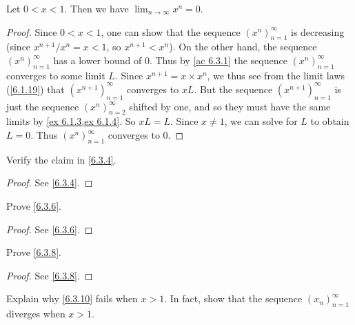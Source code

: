 \begin{proposition}\label{6.3.10}
  Let \(0 < x < 1\).
  Then we have \(\lim_{n \to \infty} x^n = 0\).
\end{proposition}

\begin{proof}
  Since \(0 < x < 1\), one can show that the sequence \((x^n)_{n = 1}^\infty\) is decreasing
  (since \(x^{n + 1} / x^n = x < 1\), so \(x^{n + 1} < x^n\)).
  On the other hand, the sequence \((x^n)_{n = 1}^\infty\) has a lower bound of \(0\).
  Thus by \cref{ac 6.3.1} the sequence \((x^n)_{n = 1}^\infty\) converges to some limit \(L\).
  Since \(x^{n + 1} = x \times x^n\), we thus see from the limit laws (\cref{6.1.19}) that \((x^{n + 1})_{n = 1}^\infty\) converges to \(xL\).
  But the sequence \((x^{n + 1})_{n = 1}^\infty\) is just the sequence \((x^n)_{n = 2}^\infty\) shifted by one, and so they must have the same limits by \cref{ex 6.1.3,ex 6.1.4}.
  So \(xL = L\).
  Since \(x \neq 1\), we can solve for \(L\) to obtain \(L = 0\).
  Thus \((x^n)_{n = 1}^\infty\) converges to \(0\).
\end{proof}

\exercisesection

\begin{exercise}\label{ex 6.3.1}
  Verify the claim in \cref{6.3.4}.
\end{exercise}

\begin{proof}
  See \cref{6.3.4}.
\end{proof}

\begin{exercise}\label{ex 6.3.2}
  Prove \cref{6.3.6}.
\end{exercise}

\begin{proof}
  See \cref{6.3.6}.
\end{proof}

\begin{exercise}\label{ex 6.3.3}
  Prove \cref{6.3.8}.
\end{exercise}

\begin{proof}
  See \cref{6.3.8}.
\end{proof}

\begin{exercise}\label{ex 6.3.4}
  Explain why \cref{6.3.10} fails when \(x > 1\).
  In fact, show that the sequence \((x_n)_{n = 1}^\infty\) diverges when \(x > 1\).
\end{exercise}

